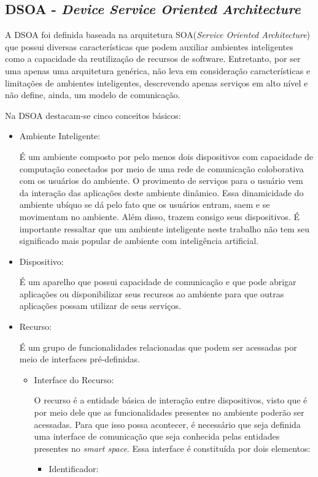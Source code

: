 \subsection{DSOA - \emph{Device Service Oriented Architecture}}

A DSOA foi definida baseada na arquitetura SOA(\emph{Service Oriented Architecture}) que possui diversas características que podem auxiliar ambientes inteligentes como a capacidade da reutilização de recursos de software. Entretanto, por ser uma apenas uma arquitetura genérica, não leva em consideração características e limitações de ambientes inteligentes, descrevendo apenas serviços em alto nível e não define, ainda, um modelo de comunicação.

Na DSOA destacam-se cinco conceitos básicos:

\begin{itemize}
	\item Ambiente Inteligente:

		É um ambiente composto por pelo menos dois dispositivos com capacidade de computação conectados por meio de uma rede de comunicação coloborativa com os usuários do ambiente. O provimento de serviços para o usuário vem da interação das aplicações deste ambiente dinâmico. Essa dinamicidade do ambiente ubíquo se dá pelo fato que os usuários entram, saem e se movimentam no ambiente. Além disso, trazem consigo seus dispositivos. É importante ressaltar que um ambiente inteligente neste trabalho não tem seu significado mais popular de ambiente com inteligência artificial.
	\item Dispositivo:

		É um aparelho que possui capacidade de comunicação e que pode abrigar aplicações ou disponibilizar seus recursos ao ambiente para que outras aplicações possam utilizar de seus serviços.
	\item Recurso:

		É um grupo de funcionalidades relacionadas que podem ser acessadas por meio de interfaces pré-definidas.
		\begin{itemize}
			\item Interface do Recurso:

				O recurso é a entidade básica de interação entre dispositivos, visto que é por meio dele que as funcionalidades presentes no ambiente poderão ser acessadas. Para que isso possa acontecer, é necessário que seja definida uma interface de comunicação que seja conhecida pelas entidades presentes no \emph{smart space}. Essa interface é constituída por dois elementos:
				\begin{itemize}
					\item Identificador:


\end{itemize}
\end{itemize}
\end{itemize}

